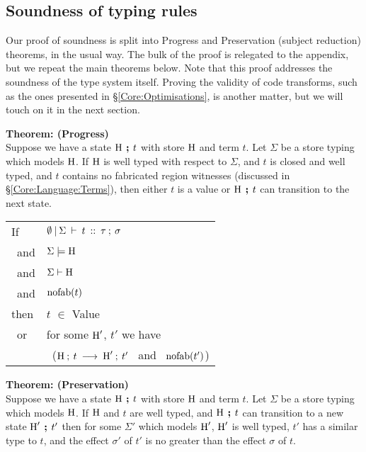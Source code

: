 \clearpage{}
\subsection{Soundness of typing rules}
\label{Core:Language:Soundness}
Our proof of soundness is split into Progress and Preservation (subject reduction) theorems, in the usual way. The bulk of the proof is relegated to the appendix, but we repeat the main theorems below. Note that this proof addresses the soundness of the type system itself. Proving the validity of code transforms, such as the ones presented in \S\ref{Core:Optimisations}, is another matter, but we will touch on it in the next section.

\bigskip
\bigskip
\textbf{Theorem: (Progress)} \\
Suppose we have a state $\textrm{H} \hspace{4pt} \textbf{;} \hspace{4pt} t$ with store $\textrm{H}$ and term $t$. 
Let $\Sigma$ be a store typing which models $\textrm{H}$. 
If $\textrm{H}$ is well typed with respect to $\Sigma$, and $t$ is closed and well typed, and $t$ contains no fabricated region witnesses (discussed in \S\ref{Core:Language:Terms}), then either $t$ is a value or $\textrm{H} \hspace{4pt} \textbf{;} \hspace{4pt} t$ can transition to the next state.

\medskip
\begin{tabular}{ll}
	If 	& $\emptyset \: \arrowvert \: \Sigma \: \vdash \: t \: :: \: \tau \: ; \: \sigma$  \\
	\ and	& $\Sigma \models \textrm{H}$ \\
	\ and	& $\Sigma \vdash  \textrm{H}$ \\
	\ and 	& $\textrm{nofab}(t)$  
	\\[1ex]
	then	& $t$ $\in$ Value \\
	\ or 	& {for some $\textrm{H}'$, $t'$ we have} \\
		& \ ($\textrm{H} \: ; \: t \: \longrightarrow \: \textrm{H}' \: ; \: t'$ \ and \ $\textrm{nofab}(t')$) 
\end{tabular}	

\bigskip
\bigskip
\textbf{Theorem: (Preservation)} \\
Suppose we have a state $\textrm{H} \hspace{4pt} \textbf{;} \hspace{4pt} t$ with store $\textrm{H}$ and term $t$.
	Let $\Sigma$ be a store typing which models $\textrm{H}$. 
	If $\textrm{H}$ and $t$ are well typed, 
		and $\textrm{H} \hspace{4pt} \textbf{;} \hspace{4pt} t$ can transition to a new state $\textrm{H}' \hspace{4pt} \textbf{;} \hspace{4pt} t'$
		then for some $\Sigma'$ which models $\textrm{H}'$, 
		$\textrm{H}'$ is well typed, 
		$t'$ has a similar type to $t$,
		and the effect $\sigma'$ of $t'$ is no greater than the effect $\sigma$ 
		of $t$.


